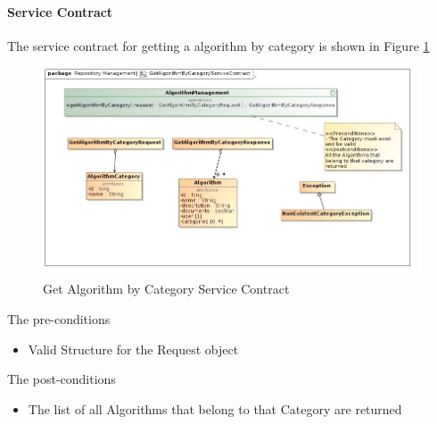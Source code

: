 \paragraph{Service Contract}
The service contract for getting a algorithm by category is shown in Figure \ref{fig:getAlgoByCategoryService}
\begin{figure}[H]
  \begin{center}
  \includegraphics[scale=0.6]{../Diagrams and Charts/Test Data/GetAlgorithmByCategoryServiceContract.jpg}
  \caption{Get Algorithm by Category Service Contract}
  \label{fig:getAlgoByCategoryService}
  \end{center}
  
\end{figure}

The pre-conditions
\begin{itemize}
  \item Valid Structure for the Request object
\end{itemize}

The post-conditions
\begin{itemize}
  \item The list of all Algorithms that belong to that Category are returned
\end{itemize}

